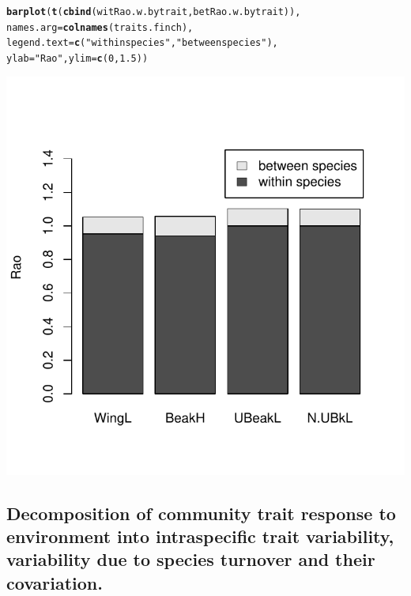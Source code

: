 \documentclass[12pt]{article}\usepackage[]{graphicx}\usepackage[]{color}
\makeatletter
\def\maxwidth{ %
  \ifdim\Gin@nat@width>\linewidth
    \linewidth
  \else
    \Gin@nat@width
  \fi
}
\newcommand{\hlnum}[1]{\textcolor[rgb]{0.686,0.059,0.569}{#1}}%
\newcommand{\hlstr}[1]{\textcolor[rgb]{0.192,0.494,0.8}{#1}}%
\newcommand{\hlstd}[1]{\textcolor[rgb]{0.345,0.345,0.345}{#1}}%
\newcommand{\hlkwc}[1]{\textcolor[rgb]{0.333,0.667,0.333}{#1}}%
\newcommand{\hlkwd}[1]{\textcolor[rgb]{0.737,0.353,0.396}{\textbf{#1}}}%
\newenvironment{kframe}{%
 \def\at@end@of@kframe{}%
 \ifinner\ifhmode%
  \def\at@end@of@kframe{\end{minipage}}%
  \begin{minipage}{\columnwidth}%
 \fi\fi%
 \def\FrameCommand##1{\hskip\@totalleftmargin \hskip-\fboxsep
 \colorbox{shadecolor}{##1}\hskip-\fboxsep
     \hskip-\linewidth \hskip-\@totalleftmargin \hskip\columnwidth}%
 \MakeFramed {\advance\hsize-\width
   \@totalleftmargin\z@ \linewidth\hsize
   \@setminipage}}%
 {\par\unskip\endMakeFramed%
 \at@end@of@kframe}
\newenvironment{knitrout}{}{} %
\makeatother
\begin{document}
\begin{knitrout}
\color{fgcolor}\begin{kframe}
\begin{alltt}
\hlkwd{barplot}\hlstd{(}\hlkwd{t}\hlstd{(}\hlkwd{cbind}\hlstd{( witRao.w.bytrait, betRao.w.bytrait)),}
    \hlkwc{names.arg} \hlstd{=} \hlkwd{colnames}\hlstd{(traits.finch),}
    \hlkwc{legend.text} \hlstd{=} \hlkwd{c}\hlstd{(}\hlstr{"within species"}\hlstd{,} \hlstr{"between species"}\hlstd{),}
    \hlkwc{ylab} \hlstd{=} \hlstr{"Rao"}\hlstd{,} \hlkwc{ylim} \hlstd{=} \hlkwd{c}\hlstd{(}\hlnum{0}\hlstd{,}\hlnum{1.5}\hlstd{))}
\end{alltt}
\end{kframe}

{\centering \includegraphics[width=\maxwidth]{figure/unnamed-chunk-21-1} 

}



\end{knitrout}


\subsection{Decomposition of community trait response to environment into intraspecific trait variability, variability due to species turnover and their covariation.}
\end{document}
